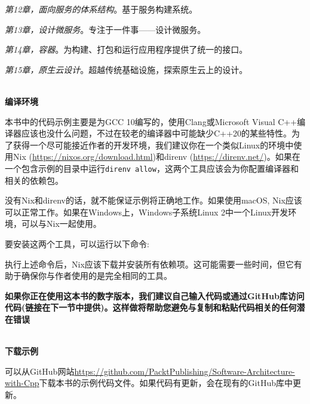 \textit{第12章，面向服务的体系结构}。基于服务构建系统。

\textit{第13章，设计微服务}。专注于一件事——设计微服务。

\textit{第14章，容器}。为构建、打包和运行应用程序提供了统一的接口。

\textit{第15章，原生云设计}。超越传统基础设施，探索原生云上的设计。

\hspace*{\fill} \\ %
\textbf{编译环境}

本书中的代码示例主要是为GCC 10编写的，使用Clang或Microsoft Visual C++编译器应该也没什么问题，不过在较老的编译器中可能缺少C++20的某些特性。为了获得一个尽可能接近作者的开发环境，我们建议你在一个类似Linux的环境中使用Nix (\url{https://nixos.org/download.html})和direnv (\url{https://direnv.net/})。如果在一个包含示例的目录中运行\texttt{direnv allow}，这两个工具应该会为你配置编译器和相关的依赖包。

没有Nix和direnv的话，就不能保证示例将正确地工作。如果使用macOS, Nix应该可以正常工作。如果在Windows上，Windows子系统Linux 2中一个Linux开发环境，可以与Nix一起使用。

要安装这两个工具，可以运行以下命令:


执行上述命令后，Nix应该下载并安装所有依赖项。这可能需要一些时间，但它有助于确保你与作者使用的是完全相同的工具。

\textbf{如果你正在使用这本书的数字版本，我们建议自己输入代码或通过GitHub库访问代码(链接在下一节中提供)。这样做将帮助您避免与复制和粘贴代码相关的任何潜在错误}

\hspace*{\fill} \\ %
\textbf{下载示例}

可以从GitHub网站\url{https://github.com/PacktPublishing/Software-Architecture-with-Cpp}下载本书的示例代码文件。如果代码有更新，会在现有的GitHub库中更新。

